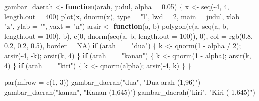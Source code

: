 \documentclass[
  indonesian,
  letterpaper,
]{book}
\newenvironment{Shaded}{\begin{snugshade}}{\end{snugshade}}
\newcommand{\AttributeTok}[1]{\textcolor[rgb]{0.40,0.45,0.13}{#1}}
\newcommand{\ConstantTok}[1]{\textcolor[rgb]{0.56,0.35,0.01}{#1}}
\newcommand{\ControlFlowTok}[1]{\textcolor[rgb]{0.00,0.23,0.31}{\textbf{#1}}}
\newcommand{\DecValTok}[1]{\textcolor[rgb]{0.68,0.00,0.00}{#1}}
\newcommand{\FloatTok}[1]{\textcolor[rgb]{0.68,0.00,0.00}{#1}}
\newcommand{\FunctionTok}[1]{\textcolor[rgb]{0.28,0.35,0.67}{#1}}
\newcommand{\NormalTok}[1]{\textcolor[rgb]{0.00,0.23,0.31}{#1}}
\newcommand{\OtherTok}[1]{\textcolor[rgb]{0.00,0.23,0.31}{#1}}
\newcommand{\SpecialCharTok}[1]{\textcolor[rgb]{0.37,0.37,0.37}{#1}}
\newcommand{\StringTok}[1]{\textcolor[rgb]{0.13,0.47,0.30}{#1}}
\begin{document}
\begin{Shaded}
\begin{Highlighting}[]
\NormalTok{gambar\_daerah }\OtherTok{\textless{}{-}} \ControlFlowTok{function}\NormalTok{(arah, judul, }\AttributeTok{alpha =} \FloatTok{0.05}\NormalTok{) \{}
\NormalTok{  x }\OtherTok{\textless{}{-}} \FunctionTok{seq}\NormalTok{(}\SpecialCharTok{{-}}\DecValTok{4}\NormalTok{, }\DecValTok{4}\NormalTok{, }\AttributeTok{length.out =} \DecValTok{400}\NormalTok{)}
  \FunctionTok{plot}\NormalTok{(x, }\FunctionTok{dnorm}\NormalTok{(x), }\AttributeTok{type =} \StringTok{"l"}\NormalTok{, }\AttributeTok{lwd =} \DecValTok{2}\NormalTok{, }\AttributeTok{main =}\NormalTok{ judul, }\AttributeTok{xlab =} \StringTok{"z"}\NormalTok{, }\AttributeTok{ylab =} \StringTok{""}\NormalTok{, }\AttributeTok{yaxt =} \StringTok{"n"}\NormalTok{)}
\NormalTok{  arsir }\OtherTok{\textless{}{-}} \ControlFlowTok{function}\NormalTok{(a, b) }\FunctionTok{polygon}\NormalTok{(}\FunctionTok{c}\NormalTok{(a, }\FunctionTok{seq}\NormalTok{(a, b, }\AttributeTok{length.out =} \DecValTok{100}\NormalTok{), b),}
                                  \FunctionTok{c}\NormalTok{(}\DecValTok{0}\NormalTok{, }\FunctionTok{dnorm}\NormalTok{(}\FunctionTok{seq}\NormalTok{(a, b, }\AttributeTok{length.out =} \DecValTok{100}\NormalTok{)), }\DecValTok{0}\NormalTok{),}
                                  \AttributeTok{col =} \FunctionTok{rgb}\NormalTok{(}\FloatTok{0.8}\NormalTok{, }\FloatTok{0.2}\NormalTok{, }\FloatTok{0.2}\NormalTok{, }\FloatTok{0.5}\NormalTok{), }\AttributeTok{border =} \ConstantTok{NA}\NormalTok{)}
  \ControlFlowTok{if}\NormalTok{ (arah }\SpecialCharTok{==} \StringTok{"dua"}\NormalTok{)   \{ k }\OtherTok{\textless{}{-}} \FunctionTok{qnorm}\NormalTok{(}\DecValTok{1} \SpecialCharTok{{-}}\NormalTok{ alpha }\SpecialCharTok{/} \DecValTok{2}\NormalTok{); }\FunctionTok{arsir}\NormalTok{(}\SpecialCharTok{{-}}\DecValTok{4}\NormalTok{, }\SpecialCharTok{{-}}\NormalTok{k); }\FunctionTok{arsir}\NormalTok{(k, }\DecValTok{4}\NormalTok{) \}}
  \ControlFlowTok{if}\NormalTok{ (arah }\SpecialCharTok{==} \StringTok{"kanan"}\NormalTok{) \{ k }\OtherTok{\textless{}{-}} \FunctionTok{qnorm}\NormalTok{(}\DecValTok{1} \SpecialCharTok{{-}}\NormalTok{ alpha); }\FunctionTok{arsir}\NormalTok{(k, }\DecValTok{4}\NormalTok{) \}}
  \ControlFlowTok{if}\NormalTok{ (arah }\SpecialCharTok{==} \StringTok{"kiri"}\NormalTok{)  \{ k }\OtherTok{\textless{}{-}} \FunctionTok{qnorm}\NormalTok{(alpha); }\FunctionTok{arsir}\NormalTok{(}\SpecialCharTok{{-}}\DecValTok{4}\NormalTok{, k) \}}
\NormalTok{\}}

\FunctionTok{par}\NormalTok{(}\AttributeTok{mfrow =} \FunctionTok{c}\NormalTok{(}\DecValTok{1}\NormalTok{, }\DecValTok{3}\NormalTok{))}
\FunctionTok{gambar\_daerah}\NormalTok{(}\StringTok{"dua"}\NormalTok{,   }\StringTok{"Dua arah (1,96)"}\NormalTok{)}
\FunctionTok{gambar\_daerah}\NormalTok{(}\StringTok{"kanan"}\NormalTok{, }\StringTok{"Kanan (1,645)"}\NormalTok{)}
\FunctionTok{gambar\_daerah}\NormalTok{(}\StringTok{"kiri"}\NormalTok{,  }\StringTok{"Kiri ({-}1,645)"}\NormalTok{)}
\end{Highlighting}
\end{Shaded}
\end{document}
